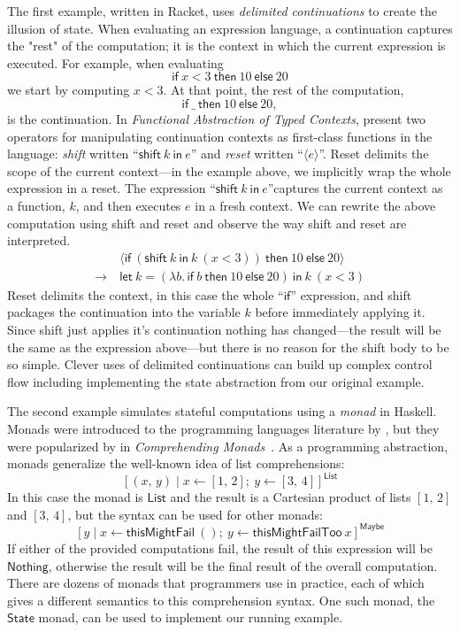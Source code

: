 \documentclass[acmsmall, nonacm]{acmart}
\newcommand{\ifThenElse}[3]{\textsf{if}~#1~\textsf{then}~#2~\textsf{else}~#3}
\newcommand{\letIn}[3]{\textsf{let}~#1 = #2~\textsf{in}~#3}
\newcommand{\shift}[2]{\textsf{shift}~#1~\textsf{in}~#2}
\newcommand{\reset}[1]{\langle #1 \rangle}
\newcommand{\lambdaE}[2]{\lambda #1.\, #2}
\newcommand{\nothing}{\textsf{Nothing}}
\begin{document}
The first example, written in Racket, uses {\em delimited continuations} to create the illusion
of state. When evaluating an expression language, a continuation captures the "rest" of the
computation; it is the context in which the current expression is executed. For example, when
evaluating
\[ \ifThenElse{x < 3}{10}{20} \]
we start by computing $x < 3$. At that point, the rest of the computation,
\[ \ifThenElse{\_}{10}{20}, \]
is the continuation. In {\em Functional Abstraction of Typed Contexts},
\citet{danvy1989functional} present two operators for manipulating continuation contexts as
first-class functions in the language: {\em shift} written ``$\shift{k}{e}$'' and {\em reset}
written ``$\reset{e}$''. Reset delimits the scope of the current context---in the example above,
we implicitly wrap the whole expression in a reset. The expression ``$\shift{k}{e}$''captures the
current context as a function, $k$, and then executes $e$ in a fresh context. We can rewrite the
above computation using shift and reset and observe the way shift and reset are interpreted.
\begin{align*}
  & \reset{\ifThenElse{(\shift{k}{k~(x < 3)})}{10}{20}} \\
  \rightarrow\ & \letIn{k}{(\lambdaE{b}{\ifThenElse{b}{10}{20}})}{k~(x < 3)}
\end{align*}
Reset delimits the context, in this case the whole ``$\textsf{if}$'' expression, and shift packages
the continuation into the variable $k$ before immediately applying it. Since shift just applies it's
continuation nothing has changed---the result will be the same as the expression above---but there
is no reason for the shift body to be so simple. Clever uses of delimited continuations can build up
complex control flow including implementing the state abstraction from our original example.

The second example simulates stateful computations using a {\em monad} in Haskell. Monads were
introduced to the programming languages literature by \citet{moggi1991notions}, but they were
popularized by \citeauthor{wadler1990comprehending} in {\em Comprehending
Monads}~\cite{wadler1990comprehending}. As a programming abstraction, monads generalize the
well-known idea of list comprehensions:
\[
  [ (x,\,y) \mid x \leftarrow [1,\, 2] ;\ y \leftarrow [3,\, 4] ]^{\textsf{List}}
\]
In this case the monad is $\textsf{List}$ and the result is a Cartesian product of lists $[1,\,
2]$ and $[3,\, 4]$, but the syntax can be used for other monads:
\[
  [ y \mid x \leftarrow \textsf{thisMightFail}~() ;\ y \leftarrow \textsf{thisMightFailToo}~{x} ]^{\textsf{Maybe}}
\]
If either of the provided computations fail, the result of this expression will be $\nothing$,
otherwise the result will be the final result of the overall computation. There are dozens of monads
that programmers use in practice, each of which gives a different semantics to this comprehension
syntax. One such monad, the $\textsf{State}$ monad, can be used to implement our running example.
\end{document}
